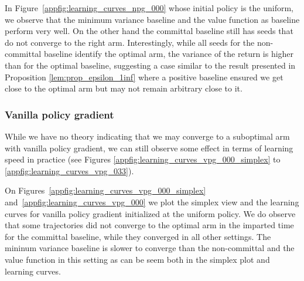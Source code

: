 In Figure~\ref{appfig:learning_curves_npg_000} whose initial policy is the uniform, we observe that the minimum variance baseline and the value function as baseline perform very well. On the other hand the committal baseline still has seeds that do not converge to the right arm. Interestingly, while all seeds for the non-committal baseline identify the optimal arm, the variance of the return is higher than for the optimal baseline, suggesting a case similar to the result presented in Proposition \ref{lem:prop_epsilon_1inf} where a positive baseline ensured we get close to the optimal arm but may not remain arbitrary close to it.


\subsubsection*{Vanilla policy gradient}
While we have no theory indicating that we may converge to a suboptimal arm with vanilla policy gradient, we can still observe some effect in terms of learning speed in practice (see Figures \ref{appfig:learning_curves_vpg_000_simplex} to \ref{appfig:learning_curves_vpg_033}). 

On Figures~\ref{appfig:learning_curves_vpg_000_simplex} and~\ref{appfig:learning_curves_vpg_000} we plot the simplex view and the learning curves for vanilla policy gradient initialized at the uniform policy. We do observe that some trajectories did not converge to the optimal arm in the imparted time for the committal baseline, while they converged in all other settings. The mininum variance baseline is slower to converge than the non-committal and the value function in this setting as can be seem both in the simplex plot and learning curves.

